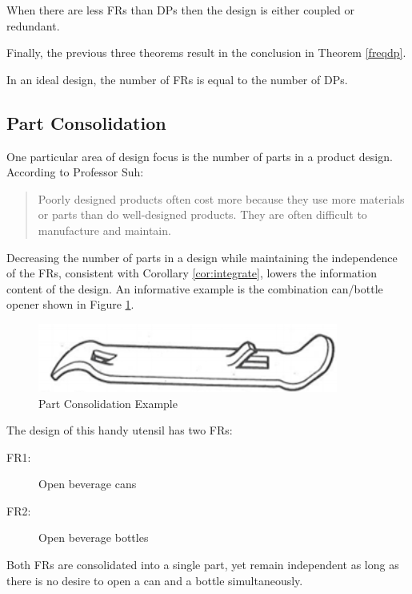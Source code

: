\begin{theorem}
  \label{thm:frltdp}
  When there are less FRs than DPs then the design is either coupled or redundant.
\end{theorem}

Finally, the previous three theorems result in the conclusion in Theorem \ref{freqdp}.

\begin{theorem}
  \label{thm:freqdp}
  In an ideal design, the number of FRs is equal to the number of DPs.
\end{theorem}

\subsection{Part Consolidation}

One particular area of design focus is the number of parts in a product design.  According to Professor Suh:
\begin{quote}
  Poorly designed products often cost more because they use more materials or parts than do well-designed products.
  They are often difficult to manufacture and maintain.
\end{quote}
Decreasing the number of parts in a design while maintaining the independence of the FRs, consistent with Corollary
\ref{cor:integrate}, lowers the information content of the design.  An informative example is the combination
can/bottle opener shown in Figure \ref{fig:opener}.

\begin{figure}[h]
  \label{fig:opener}
  \begin{center}
    \includegraphics{opener}
  \end{center}
  \caption{Part Consolidation Example}
\end{figure}

The design of this handy utensil has two FRs:

\begin{description}
\item[FR1:] Open beverage cans
\item[FR2:] Open beverage bottles
\end{description}

Both FRs are consolidated into a single part, yet remain independent as long as there is no desire to open a can and
a bottle simultaneously.

